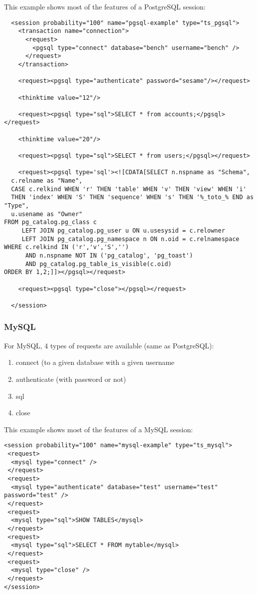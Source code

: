 \documentclass{TSUNG-en}
\begin{document}
This example shows most of the features of a PostgreSQL session:

\begin{Verbatim}
  <session probability="100" name="pgsql-example" type="ts_pgsql">
    <transaction name="connection">
      <request>
        <pgsql type="connect" database="bench" username="bench" />
      </request>
    </transaction>

    <request><pgsql type="authenticate" password="sesame"/></request>

    <thinktime value="12"/>

    <request><pgsql type="sql">SELECT * from accounts;</pgsql></request>

    <thinktime value="20"/>

    <request><pgsql type="sql">SELECT * from users;</pgsql></request>

    <request><pgsql type='sql'><![CDATA[SELECT n.nspname as "Schema",
  c.relname as "Name",
  CASE c.relkind WHEN 'r' THEN 'table' WHEN 'v' THEN 'view' WHEN 'i'
  THEN 'index' WHEN 'S' THEN 'sequence' WHEN 's' THEN '%_toto_% END as "Type",
  u.usename as "Owner"
FROM pg_catalog.pg_class c
     LEFT JOIN pg_catalog.pg_user u ON u.usesysid = c.relowner
     LEFT JOIN pg_catalog.pg_namespace n ON n.oid = c.relnamespace
WHERE c.relkind IN ('r','v','S','')
      AND n.nspname NOT IN ('pg_catalog', 'pg_toast')
      AND pg_catalog.pg_table_is_visible(c.oid)
ORDER BY 1,2;]]></pgsql></request>

    <request><pgsql type="close"></pgsql></request>

  </session>
\end{Verbatim}

\subsubsection{MySQL}
\label{sec:session:mysql}
For MySQL, 4 types of requests are available (same as PostgreSQL):
\begin{enumerate}
\item connect (to a given database with a given username
\item authenticate (with password or not)
\item sql
\item close
\end{enumerate}

This example shows most of the features of a MySQL session:

\begin{Verbatim}
<session probability="100" name="mysql-example" type="ts_mysql">
 <request>
  <mysql type="connect" />
 </request>
 <request>
  <mysql type="authenticate" database="test" username="test" password="test" />
 </request>
 <request>
  <mysql type="sql">SHOW TABLES</mysql>
 </request>
 <request>
  <mysql type="sql">SELECT * FROM mytable</mysql>
 </request>
 <request>
  <mysql type="close" />
 </request>
</session>
\end{Verbatim}
\end{document}
